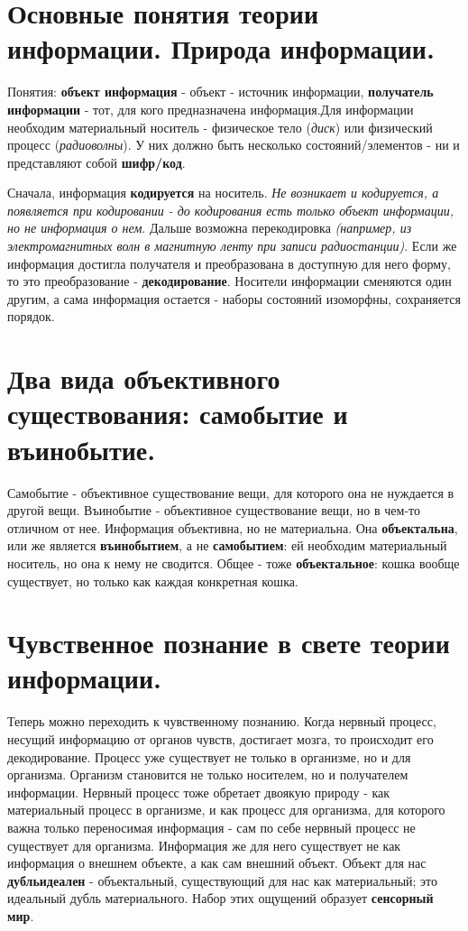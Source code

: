 \section{ Основные понятия теории информации. Природа информации.}
Понятия: \textbf{объект информация} - объект - источник информации, \textbf{получатель информации} - тот, для кого предназначена информация.Для информации необходим материальный носитель - физическое тело (\textit{диск}) или физический процесс (\textit{радиоволны}). У них должно быть несколько состояний/элементов - ни и представляют собой \textbf{шифр/код}.

Сначала, информация \textbf{кодируется} на носитель. \textit{Не возникает и кодируется, а появляется при кодировании - до кодирования есть только объект информации, но не информация о нем}. Дальше возможна перекодировка \textit{(например, из электромагнитных волн в магнитную ленту при записи радиостанции)}. Если же информация достигла получателя и преобразована в доступную для него форму, то это преобразование - \textbf{декодирование}. Носители информации сменяются один другим, а сама информация остается - наборы состояний изоморфны, сохраняется порядок.

\section{ Два вида объективного существования: самобытие и въинобытие.}
Самобытие - объективное существование вещи, для которого она не нуждается в другой вещи. Въинобытие - объективное существование вещи, но в чем-то отличном от нее.
Информация объективна, но не материальна. Она \textbf{объектальна}, или же является \textbf{въинобытием}, а не \textbf{самобытием}: ей необходим материальный носитель, но она к нему не сводится. Общее - тоже \textbf{объектальное}: кошка вообще существует, но только как каждая конкретная кошка.

\section{ Чувственное познание в свете теории информации.}
Теперь можно переходить к чувственному познанию. Когда нервный процесс, несущий информацию от органов чувств, достигает мозга, то происходит его декодирование. Процесс уже существует не только в организме, но и для организма. Организм становится не только носителем, но и получателем информации. Нервный процесс тоже обретает двоякую природу - как материальный процесс в организме, и как процесс для организма, для которого важна только переносимая информация - сам по себе нервный процесс не существует для организма. Информация же для него существует не как информация о внешнем объекте, а как сам внешний объект. Объект для нас \textbf{дубльидеален} - объектальный, существующий для нас как материальный; это идеальный дубль материального. Набор этих ощущений образует \textbf{сенсорный мир}.

